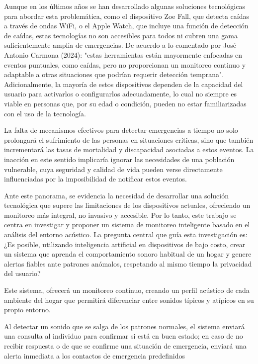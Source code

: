 Aunque en los últimos años se han desarrollado algunas soluciones tecnológicas para abordar esta problemática, como el dispositivo Zoe Fall, que detecta caídas a través de ondas WiFi, o el Apple Watch, que incluye una función de detección de caídas, estas tecnologías no son accesibles para todos ni cubren una gama suficientemente amplia de emergencias. De acuerdo a lo comentado por José Antonio Carmona (2024): "estas herramientas están mayormente enfocadas en eventos puntuales, como caídas, pero no proporcionan un monitoreo continuo y adaptable a otras situaciones que podrían requerir detección temprana". Adicionalmente, la mayoría de estos dispositivos dependen de la capacidad del usuario para activarlos o configurarlos adecuadamente, lo cual no siempre es viable en personas que, por su edad o condición, pueden no estar familiarizadas con el uso de la tecnología.

La falta de mecanismos efectivos para detectar emergencias a tiempo no solo prolongará el sufrimiento de las personas en situaciones críticas, sino que también incrementará las tasas de mortalidad y discapacidad asociadas a estos eventos. La inacción en este sentido implicaría ignorar las necesidades de una población vulnerable, cuya seguridad y calidad de vida pueden verse directamente influenciadas por la imposibilidad de notificar estos eventos.

Ante este panorama, se evidencia la necesidad de desarrollar una solución tecnológica que supere las limitaciones de los dispositivos actuales, ofreciendo un monitoreo más integral, no invasivo y accesible. Por lo tanto, este trabajo se centra en investigar y proponer un sistema de monitoreo inteligente basado en el análisis del entorno acústico. La pregunta central que guía esta investigación es: ¿Es posible, utilizando inteligencia artificial en dispositivos de bajo costo, crear un sistema que aprenda el comportamiento sonoro habitual de un hogar y genere alertas fiables ante patrones anómalos, respetando al mismo tiempo la privacidad del usuario?

Este sistema, ofrecerá un monitoreo continuo, creando un perfil acústico de cada ambiente del hogar que permitirá diferenciar entre sonidos típicos y atípicos en su propio entorno.

Al detectar un sonido que se salga de los patrones normales, el sistema enviará una consulta al individuo para confirmar si está en buen estado; en caso de no recibir respuesta o de que se confirme una situación de emergencia, enviará una alerta inmediata a los contactos de emergencia predefinidos

